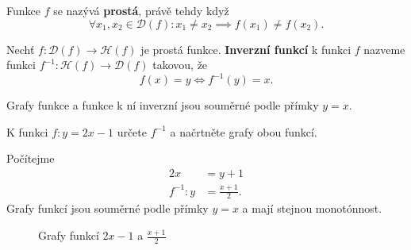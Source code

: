 \begin{definition}
  Funkce $f$ se nazývá \textbf{prostá}, právě tehdy když
  \[
    \forall x_1,x_2\in \mathcal D(f)\colon x_1\ne x_2 \implies f(x_1)\ne f(x_2).
  \]
\end{definition}

\begin{definition}
	Nechť $f\colon \mathcal D(f)\to \mathcal H(f)$ je prostá funkce. \textbf{Inverzní funkcí} k funkci $f$ nazveme funkci
	$f^{-1}\colon \mathcal H(f)\to \mathcal D(f)$ takovou, že
	$$
	    f(x)=y\iff f^{-1}(y)=x.
	$$
\end{definition}

\begin{pozn}
	   Grafy funkce a funkce k ní inverzní jsou souměrné podle přímky $y=x$.
\end{pozn}

\begin{priklad}
K funkci $f\colon y=2x-1$ určete $f^{-1}$ a načrtněte grafy obou funkcí.
\end{priklad}

\begin{reseni}
Počítejme
\begin{align*}
    2x&=y+1\\
    f^{-1}\colon y &= \frac{x+1}{2}.
\end{align*}
Grafy funkcí jsou souměrné podle přímky $y=x$ a mají stejnou monotónnost.

\begin{figure}[ht!]
  \centering
  \caption{Grafy funkcí $2x-1$ a $\frac{x+1}{2}$}
\end{figure}
\end{reseni}

